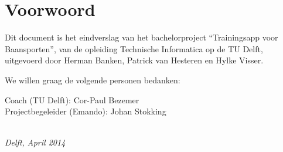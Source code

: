 \chapter*{Voorwoord}

Dit document is het eindverslag van het bachelorproject ``Trainingsapp voor Baansporten'', van de opleiding Technische Informatica op de TU Delft, uitgevoerd door Herman Banken, Patrick van Hesteren en Hylke Visser.

\bigskip

\noindent We willen graag de volgende personen bedanken:

\medskip

\noindent
Coach (TU Delft): Cor-Paul Bezemer\\
Projectbegeleider (Emando): Johan Stokking

\bigskip

\begin{flushright}
{\makeatletter\itshape
    \@author \\
    Delft, April 2014
\makeatother}
\end{flushright}